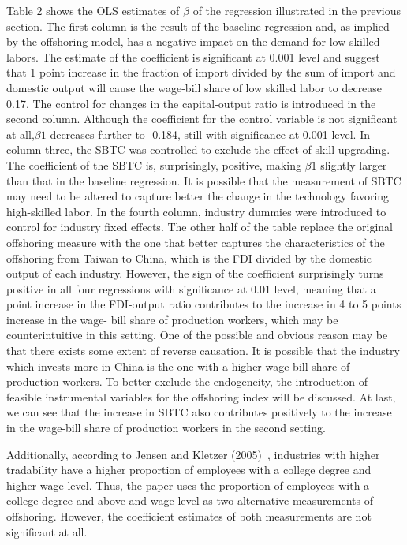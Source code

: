 \documentclass{article}
\begin{document}
Table 2 shows the OLS estimates of $\beta$ of the regression illustrated in the previous section. The first column is the result of the baseline regression and, as implied by the offshoring model, has a negative impact on the demand for low-skilled labors. The estimate of the coefficient is significant at 0.001 level and suggest that 1 point increase in the fraction of import divided by the sum of import and domestic output will cause the wage-bill share of low skilled labor to decrease 0.17. The control for changes in the capital-output ratio is introduced in the second column. Although the coefficient for the control variable is not significant at all,$\beta 1$ decreases further to -0.184, still with significance at 0.001 level. In column three, the SBTC was controlled to exclude the effect of skill upgrading. The coefficient of the SBTC is, surprisingly, positive, making $\beta 1$ slightly larger than that in the baseline regression. It is possible that the measurement of SBTC may need to be altered to capture better the change in the technology favoring high-skilled labor. In the fourth column, industry dummies were introduced to control for industry fixed effects. The other half of the table replace the original offshoring measure with the one that better captures the characteristics of the offshoring from Taiwan to China, which is the FDI divided by the domestic output of each industry. However, the sign of the coefficient surprisingly turns positive in all four regressions with significance at 0.01 level, meaning that a point increase in the FDI-output ratio contributes to the increase in 4 to 5 points increase in the wage- bill share of production workers, which may be counterintuitive in this setting. One of the possible and obvious reason may be that there exists some extent of reverse causation. It is possible that the industry which invests more in China is the one with a higher wage-bill share of production workers. To better exclude the endogeneity, the introduction of feasible instrumental variables for the offshoring index will be discussed. At last, we can see that the increase in SBTC also contributes positively to the increase in the wage-bill share of production workers in the second setting.\par

Additionally, according to Jensen and Kletzer (2005)~\cite{jensen2005tradable}, industries with higher tradability have a higher proportion of employees with a college degree and higher wage level. Thus, the paper uses the proportion of employees with a college degree and above and wage level as two alternative measurements of offshoring. However, the coefficient estimates of both measurements are not significant at all. \par
\end{document}
